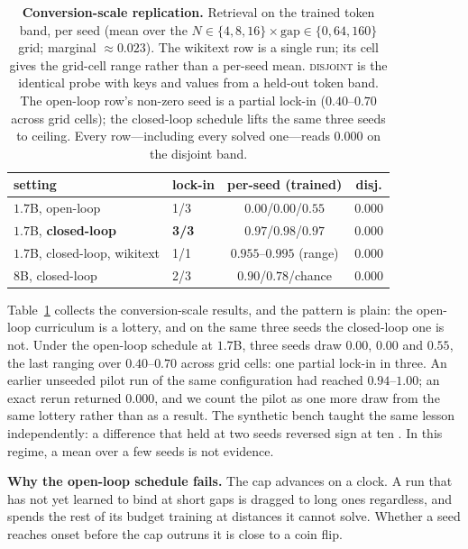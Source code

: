 \documentclass{article}
\newcommand{\disj}{\textsc{disjoint}}
\begin{document}
\begin{table}[t]
\centering
\caption{\textbf{Conversion-scale replication.} Retrieval on the trained token band, per seed (mean over the $N\in\{4,8,16\}\times\text{gap}\in\{0,64,160\}$ grid; marginal ${\approx}0.023$). The wikitext row is a single run; its cell gives the grid-cell range rather than a per-seed mean. \disj{} is the identical probe with keys and values from a held-out token band. The open-loop row's non-zero seed is a partial lock-in ($0.40$--$0.70$ across grid cells); the closed-loop schedule lifts the same three seeds to ceiling. Every row---including every solved one---reads $0.000$ on the disjoint band.}
\label{tab:atscale}
\vskip 0.1in
\scriptsize
\setlength{\tabcolsep}{3.5pt}
\begin{tabular}{@{}llcc@{}}
\toprule
setting & lock-in & per-seed (trained) & disj. \\
\midrule
$1.7$B, open-loop          & 1/3          & $0.00$/$0.00$/$0.55$ & $0.000$ \\
$1.7$B, \textbf{closed-loop} & \textbf{3/3} & $\mathbf{0.97}$/$\mathbf{0.98}$/$\mathbf{0.97}$ & $0.000$ \\
$1.7$B, closed-loop, wikitext & 1/1       & $0.955$--$0.995$ (range) & $0.000$ \\
$8$B, closed-loop          & 2/3          & $0.90$/$0.78$/chance & $0.000$ \\
\bottomrule
\end{tabular}
\end{table}

Table~\ref{tab:atscale} collects the conversion-scale results, and the pattern is plain: the open-loop curriculum is a lottery, and on the same three seeds the closed-loop one is not. Under the open-loop schedule at $1.7$B, three seeds draw $0.00$, $0.00$ and $0.55$, the last ranging over $0.40$--$0.70$ across grid cells: one partial lock-in in three. An earlier unseeded pilot run of the same configuration had reached $0.94$--$1.00$; an exact rerun returned $0.000$, and we count the pilot as one more draw from the same lottery rather than as a result. The synthetic bench taught the same lesson independently: a difference that held at two seeds reversed sign at ten \citep{anatomyrecall}. In this regime, a mean over a few seeds is not evidence.

\textbf{Why the open-loop schedule fails.} The cap advances on a clock. A run that has not yet learned to bind at short gaps is dragged to long ones regardless, and spends the rest of its budget training at distances it cannot solve. Whether a seed reaches onset before the cap outruns it is close to a coin flip.
\end{document}
